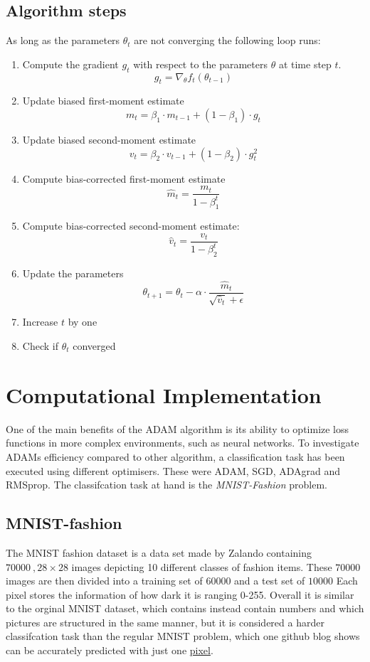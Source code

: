 \documentclass[oneside]{article}
\begin{document}
\subsection{Algorithm steps}
As long as the parameters $\theta_t$ are not converging the following loop runs:
\begin{enumerate}
    \item Compute the gradient \(g_t\) with respect to the parameters \(\theta\) at time step \(t\).\\
    $$g_t= \nabla_{\theta} f_t(\theta_{t-1})$$
    \item Update biased first-moment estimate
    $$m_t = \beta_1 \cdot m_{t-1} + (1 - \beta_1) \cdot g_t$$
    \item Update biased second-moment estimate
    $$v_t = \beta_2 \cdot v_{t-1} + (1 - \beta_2) \cdot g_t^2$$
    \item Compute bias-corrected first-moment estimate
    $$\hat{m}_t = \frac{m_t}{1 - \beta_1^t}$$
    \item Compute bias-corrected second-moment estimate: 
    $$\hat{v}_t = \frac{v_t}{1 - \beta_2^t}$$
    \item Update the parameters
    $$\theta_{t+1} = \theta_t - \alpha \cdot \frac{\hat{m}_t}{\sqrt{\hat{v}_t} + \epsilon}$$
    \item Increase $t$ by one
    \item Check if $\theta_t$ converged
\end{enumerate}




\section{Computational Implementation}
One of the main benefits of the ADAM algorithm is its ability to optimize loss functions in more complex environments, such as neural networks. To investigate ADAMs efficiency compared to other algorithm, a classification task has been executed using different optimisers. These were ADAM, SGD, ADAgrad and RMSprop. The classifcation task at hand is the \textit{MNIST-Fashion} problem. 

\subsection{MNIST-fashion}

The MNIST fashion dataset is a data set made by Zalando containing $70 000 \ ,28 \times 28$ images depicting 10 different classes of fashion items. These $70 000$ images are then divided into a training set of $60000$ and a test set of $10000$
Each pixel stores the information of how dark it is ranging 0-255. Overall it is similar to the orginal MNIST dataset, which contains instead contain numbers and which pictures are structured in the same manner, but it is considered a harder classifcation task than the regular MNIST problem, which one  github blog shows can be accurately predicted with just one \hyperlink{https://gist.github.com/dgrtwo/aaef94ecc6a60cd50322c0054cc04478}{pixel}. 
\end{document}
